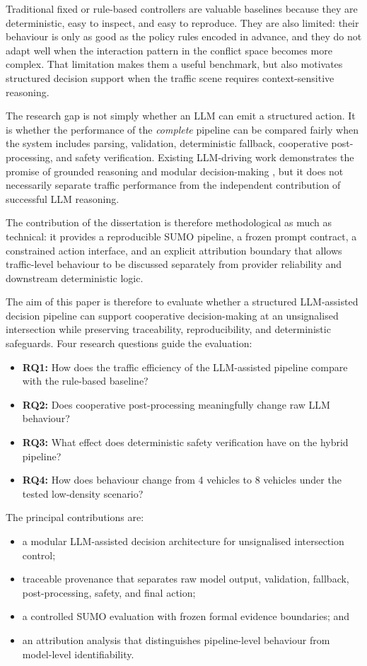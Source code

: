 \documentclass[letterpaper,10pt,conference]{ieeeconf}
\begin{document}
Traditional fixed or rule-based controllers are valuable baselines because they are deterministic, easy to inspect, and easy to reproduce. They are also limited: their behaviour is only as good as the policy rules encoded in advance, and they do not adapt well when the interaction pattern in the conflict space becomes more complex. That limitation makes them a useful benchmark, but also motivates structured decision support when the traffic scene requires context-sensitive reasoning.

The research gap is not simply whether an LLM can emit a structured action. It is whether the performance of the \emph{complete} pipeline can be compared fairly when the system includes parsing, validation, deterministic fallback, cooperative post-processing, and safety verification. Existing LLM-driving work demonstrates the promise of grounded reasoning and modular decision-making \cite{Huang2022,Driess2023,Wen2023,Li2024,Ma2024,Cui2024,Hou2025,Dong2026,Xie2025}, but it does not necessarily separate traffic performance from the independent contribution of successful LLM reasoning.

The contribution of the dissertation is therefore methodological as much as technical: it provides a reproducible SUMO pipeline, a frozen prompt contract, a constrained action interface, and an explicit attribution boundary that allows traffic-level behaviour to be discussed separately from provider reliability and downstream deterministic logic.

The aim of this paper is therefore to evaluate whether a structured LLM-assisted decision pipeline can support cooperative decision-making at an unsignalised intersection while preserving traceability, reproducibility, and deterministic safeguards. Four research questions guide the evaluation:
\begin{itemize}
    \item \textbf{RQ1:} How does the traffic efficiency of the LLM-assisted pipeline compare with the rule-based baseline?
    \item \textbf{RQ2:} Does cooperative post-processing meaningfully change raw LLM behaviour?
    \item \textbf{RQ3:} What effect does deterministic safety verification have on the hybrid pipeline?
    \item \textbf{RQ4:} How does behaviour change from 4 vehicles to 8 vehicles under the tested low-density scenario?
\end{itemize}

The principal contributions are:
\begin{itemize}
    \item a modular LLM-assisted decision architecture for unsignalised intersection control;
    \item traceable provenance that separates raw model output, validation, fallback, post-processing, safety, and final action;
    \item a controlled SUMO evaluation with frozen formal evidence boundaries; and
    \item an attribution analysis that distinguishes pipeline-level behaviour from model-level identifiability.
\end{itemize}
\end{document}
